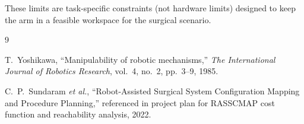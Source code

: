 \documentclass[a4paper,11pt]{article}
\begin{document}
These limits are task-specific constraints (not hardware limits) designed to keep the arm in a feasible workspace for the surgical scenario.

\begin{thebibliography}{9}

T.~Yoshikawa, ``Manipulability of robotic mechanisms,''
\textit{The International Journal of Robotics Research}, vol.~4, no.~2, pp.~3--9, 1985.

C.~P.~Sundaram \textit{et al.}, ``Robot-Assisted Surgical System Configuration Mapping and Procedure Planning,''
referenced in project plan for RASSCMAP cost function and reachability analysis, 2022.

\end{thebibliography}
\end{document}
